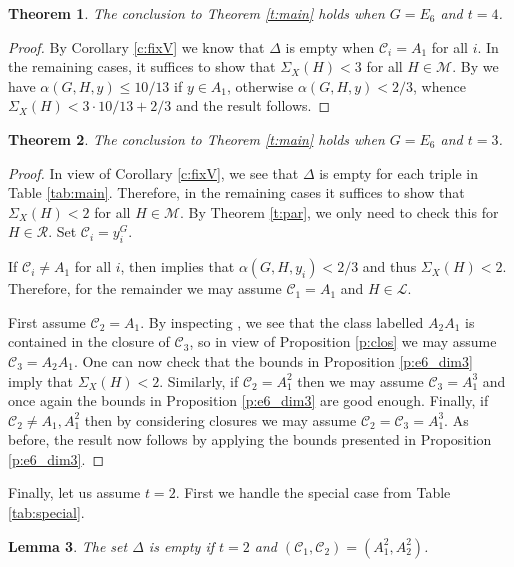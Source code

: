 \documentclass[twoside,a4paper,reqno,11pt]{amsart}
\renewcommand{\a}{\alpha}
\newcommand{\<}{\langle}
\renewcommand{\>}{\rangle}
\newcommand{\leqs}{\leqslant}
\renewcommand{\:}{\colon}
\theoremstyle{plain}
\newtheorem{thm}{Theorem}[section]
\newtheorem{lem}[thm]{Lemma}
\theoremstyle{definition}
\begin{document}
\begin{thm}\label{t:e6_4}
The conclusion to Theorem \ref{t:main} holds when $G = E_6$ and $t=4$.
\end{thm}

\begin{proof}
By Corollary \ref{c:fixV} we know that $\Delta$ is empty when $\mathcal{C}_i = A_1$ for all $i$. In the remaining cases, it suffices to show that $\Sigma_X(H)<3$ for all $H \in \mathcal{M}$. By \cite[Theorem 3.1]{BGG1} we have $\a(G,H,y) \leqs 10/13$ if $y \in A_1$, otherwise $\a(G,H,y)<2/3$, whence $\Sigma_X(H) < 3\cdot 10/13+2/3$ and the result follows.
\end{proof}

\begin{thm}\label{t:e6_3}
The conclusion to Theorem \ref{t:main} holds when $G = E_6$ and $t=3$.
\end{thm}

\begin{proof}
In view of Corollary \ref{c:fixV}, we see that $\Delta$ is empty for each triple in Table \ref{tab:main}. Therefore, in the remaining cases it suffices to show that $\Sigma_X(H)<2$ for all $H \in \mathcal{M}$. By Theorem \ref{t:par}, we only need to check this for $H \in \mathcal{R}$. Set $\mathcal{C}_i = y_i^G$. 

If $\mathcal{C}_i \ne A_1$ for all $i$, then \cite[Theorem 3.1]{BGG1} implies that $\a(G,H,y_i)<2/3$ and thus $\Sigma_X(H) <2$.  Therefore, for the remainder we may assume $\mathcal{C}_1 = A_1$ and $H \in \mathcal{L}$. 

First assume $\mathcal{C}_2 = A_1$. By inspecting \cite{Spal}, we see that the class labelled $A_2A_1$ is contained in the closure of $\mathcal{C}_3$, so in view of Proposition \ref{p:clos} we may assume $\mathcal{C}_3 = A_2A_1$. One can now check that the bounds in Proposition \ref{p:e6_dim3} imply that $\Sigma_X(H)<2$. Similarly, if $\mathcal{C}_2 = A_1^2$ then we may assume $\mathcal{C}_3 = A_1^3$ and once again the bounds in Proposition \ref{p:e6_dim3} are good enough. Finally, if $\mathcal{C}_2 \ne A_1,A_1^2$ then by considering closures we may assume $\mathcal{C}_2 = \mathcal{C}_3 = A_1^3$. As before, the result now follows by applying the bounds presented in Proposition \ref{p:e6_dim3}.
\end{proof}

Finally, let us assume $t=2$. First we handle the special case from Table \ref{tab:special}.

\begin{lem}\label{l:e6_3}
The set $\Delta$ is empty if $t=2$ and $(\mathcal{C}_1,\mathcal{C}_2) = (A_1^2,A_2^2)$. 
\end{lem}
\end{document}
